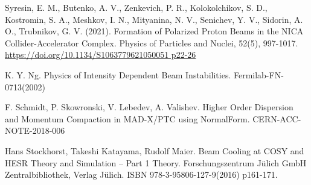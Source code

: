 \documentclass[a4paper,
               keeplastbox,   %
               ]{jacow}
\begin{document}
	{\printbibliography}
	{
	\begin{thebibliography}{9}
	
	Syresin, E. M., Butenko, A. V., Zenkevich, P. R., Kolokolchikov, S. D., Kostromin, S. A., Meshkov, I. N., Mityanina, N. V., Senichev, Y. V., Sidorin, A. O., Trubnikov, G. V. (2021). Formation of Polarized Proton Beams in the NICA Collider-Accelerator Complex. Physics of Particles and Nuclei, 52(5), 997-1017.
	\url{https://doi.org/10.1134/S1063779621050051 p22-26}
	
	K. Y. Ng. Physics of Intensity Dependent Beam Instabilities. Fermilab-FN-0713(2002)

	F. Schmidt, P. Skowronski, V. Lebedev, A. Valishev. Higher Order Dispersion and Momentum Compaction in MAD-X/PTC using NormalForm. CERN-ACC-NOTE-2018-006
	
	Hans Stockhorst, Takeshi Katayama, Rudolf Maier. Beam Cooling at COSY and HESR Theory and Simulation – Part 1 Theory. Forschungszentrum Jülich GmbH Zentralbibliothek, Verlag Jülich. ISBN 978-3-95806-127-9(2016) p161-171.

	\end{thebibliography}
} 
\end{document}
